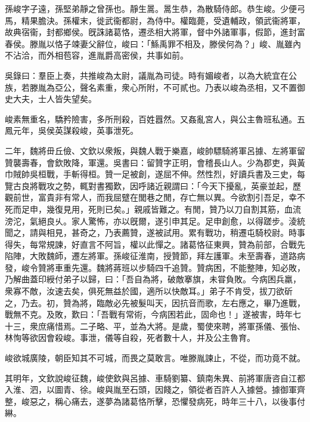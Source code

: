 
\begin{pinyinscope}
孫峻字子遠，孫堅弟靜之曾孫也。靜生暠。暠生恭，為散騎侍郎。恭生峻。少便弓馬，精果膽決。孫權末，徙武衞都尉，為侍中。權臨薨，受遺輔政，領武衞將軍，故典宿衞，封都鄉侯。旣誅諸葛恪，遷丞相大將軍，督中外諸軍事，假節，進封富春侯。滕胤以恪子竦妻父辭位，峻曰：「鯀禹罪不相及，滕侯何為？」峻、胤雖內不沾洽，而外相苞容，進胤爵高密侯，共事如前。

吳錄曰：羣臣上奏，共推峻為太尉，議胤為司徒。時有媚峻者，以為大統宜在公族，若滕胤為亞公，聲名素重，衆心所附，不可貳也。乃表以峻為丞相，又不置御史大夫，士人皆失望矣。

峻素無重名，驕矜險害，多所刑殺，百姓囂然。又姦亂宮人，與公主魯班私通。五鳳元年，吳侯英謀殺峻，英事泄死。

二年，魏將毌丘儉、文欽以衆叛，與魏人戰于樂嘉，峻帥驃騎將軍呂據、左將軍留贊襲壽春，會欽敗降，軍還。吳書曰：留贊字正明，會稽長山人。少為郡吏，與黃巾賊帥吳桓戰，手斬得桓。贊一足被創，遂屈不伸。然性烈，好讀兵書及三史，每覽古良將戰攻之勢，輒對書獨歎，因呼諸近親謂曰：「今天下擾亂，英豪並起，歷觀前世，富貴非有常人，而我屈躄在閭巷之閒，存亡無以異。今欲割引吾足，幸不死而足申，幾復見用，死則已矣。」親戚皆難之。有閒，贊乃以刀自割其筋，血流滂沱，氣絕良乆。家人驚怖，亦以旣爾，遂引申其足。足申創愈，以得蹉步。淩統聞之，請與相見，甚奇之，乃表薦贊，遂被試用。累有戰功，稍遷屯騎校尉。時事得失，每常規諫，好直言不阿旨，權以此憚之。諸葛恪征東興，贊為前部，合戰先陷陣，大敗魏師，遷左將軍。孫峻征淮南，授贊節，拜左護軍。未至壽春，道路病發，峻令贊將車重先還。魏將蔣班以步騎四千追贊。贊病困，不能整陣，知必敗，乃解曲蓋印綬付弟子以歸，曰：「吾自為將，破敵搴旗，未甞負敗。今病困兵羸，衆寡不敵，汝速去矣，俱死無益於國，適所以快敵耳。」弟子不肯受，拔刀欲斫之，乃去。初，贊為將，臨敵必先被髮叫天，因抗音而歌，左右應之，畢乃進戰，戰無不克。及敗，歎曰：「吾戰有常術，今病困若此，固命也！」遂被害，時年七十三，衆庶痛惜焉。二子略、平，並為大將。是歲，蜀使來聘，將軍孫儀、張怡、林恂等欲因會殺峻。事泄，儀等自殺，死者數十人，并及公主魯育。

峻欲城廣陵，朝臣知其不可城，而畏之莫敢言。唯滕胤諫止，不從，而功竟不就。

其明年，文欽說峻征魏，峻使欽與呂據、車騎劉纂、鎮南朱異、前將軍唐咨自江都入淮、泗，以圖青、徐。峻與胤至石頭，因餞之，領從者百許人入據營。據御軍齊整，峻惡之，稱心痛去，遂夢為諸葛恪所擊，恐懼發病死，時年三十八，以後事付綝。


\end{pinyinscope}